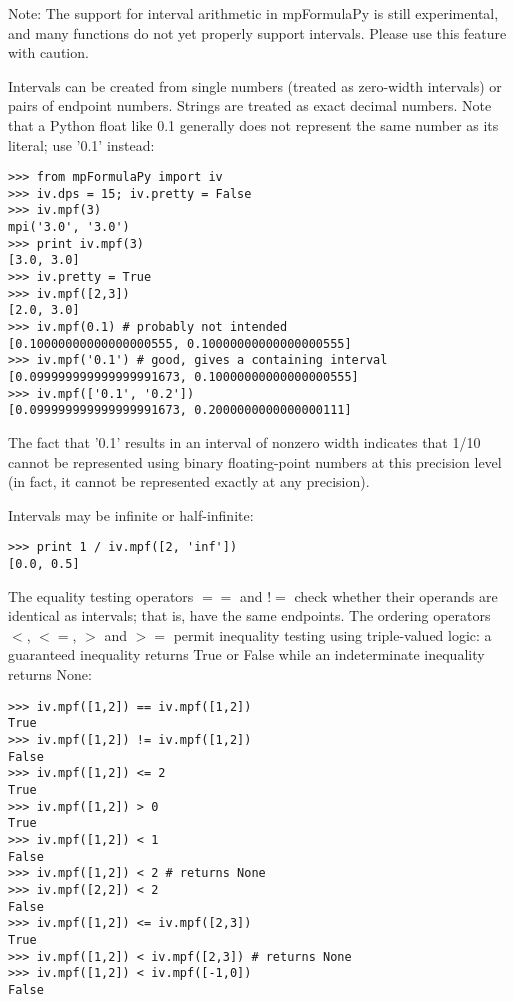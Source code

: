 \vpara
Note: The support for interval arithmetic in mpFormulaPy is still experimental, and many functions do not yet properly support intervals. Please use this feature with caution.

\vpara
Intervals can be created from single numbers (treated as zero-width intervals) or pairs of endpoint numbers. Strings are treated as exact decimal numbers. Note that a Python float like 0.1 generally does not represent the same number as its literal; use '0.1' instead:

\begin{lstlisting}
>>> from mpFormulaPy import iv
>>> iv.dps = 15; iv.pretty = False
>>> iv.mpf(3)
mpi('3.0', '3.0')
>>> print iv.mpf(3)
[3.0, 3.0]
>>> iv.pretty = True
>>> iv.mpf([2,3])
[2.0, 3.0]
>>> iv.mpf(0.1) # probably not intended
[0.10000000000000000555, 0.10000000000000000555]
>>> iv.mpf('0.1') # good, gives a containing interval
[0.099999999999999991673, 0.10000000000000000555]
>>> iv.mpf(['0.1', '0.2'])
[0.099999999999999991673, 0.2000000000000000111]
\end{lstlisting}


The fact that '0.1' results in an interval of nonzero width indicates that 1/10 cannot be represented using binary floating-point numbers at this precision level (in fact, it cannot be represented exactly at any precision).

\vpara
Intervals may be infinite or half-infinite:

\begin{lstlisting}
>>> print 1 / iv.mpf([2, 'inf'])
[0.0, 0.5]
\end{lstlisting}


The equality testing operators $==$ and $!=$ check whether their operands are identical as intervals; that is, have the same endpoints. The ordering operators $<$,  $<=$,  $>$ and $>=$ permit inequality testing using triple-valued logic: a guaranteed inequality returns True or False while an indeterminate inequality returns None:

\begin{lstlisting}
>>> iv.mpf([1,2]) == iv.mpf([1,2])
True
>>> iv.mpf([1,2]) != iv.mpf([1,2])
False
>>> iv.mpf([1,2]) <= 2
True
>>> iv.mpf([1,2]) > 0
True
>>> iv.mpf([1,2]) < 1
False
>>> iv.mpf([1,2]) < 2 # returns None
>>> iv.mpf([2,2]) < 2
False
>>> iv.mpf([1,2]) <= iv.mpf([2,3])
True
>>> iv.mpf([1,2]) < iv.mpf([2,3]) # returns None
>>> iv.mpf([1,2]) < iv.mpf([-1,0])
False
\end{lstlisting}


